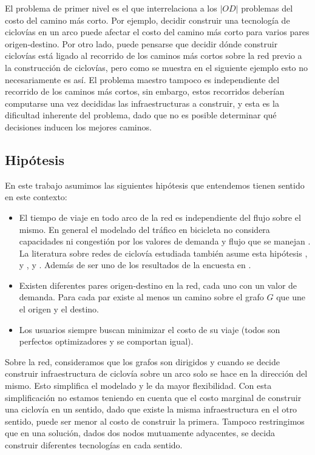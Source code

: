 \documentclass{article}
\begin{document}
  El problema de primer nivel es el que interrelaciona a los $|OD|$ problemas del costo del camino más corto. Por ejemplo, decidir construir una tecnología de ciclovías en un arco puede afectar el costo del camino más corto para varios pares origen-destino. Por otro lado, puede pensarse que decidir dónde construir ciclovías está ligado al recorrido de los caminos más cortos sobre la red previo a la construcción de ciclovías, pero como se muestra en el siguiente ejemplo esto no necesariamente es así. El problema maestro tampoco es independiente del recorrido de los caminos más cortos, sin embargo, estos recorridos deberían computarse una vez decididas las infraestructuras a construir, y esta es la dificultad inherente del problema, dado que no es posible determinar qué decisiones inducen los mejores caminos.

  \subsection{Hipótesis}

  En este trabajo asumimos las siguientes hipótesis que entendemos tienen sentido en este contexto:

  \begin{itemize}
    \item{El tiempo de viaje en todo arco de la red es independiente del flujo sobre el mismo. En general el modelado del tráfico en bicicleta no considera capacidades ni congestión por los valores de demanda y flujo que se manejan \cite{Sheffi1985}. La literatura sobre redes de ciclovía estudiada también asume esta hipótesis \cite{Lin2013}, \cite{Duthie2014} y \cite{liu2019},  \cite{Zhu2019} y \cite{baya2021}. Además de ser uno de los resultados de la encuesta en \cite{broach2012}.}
    \item{Existen diferentes pares origen-destino en la red, cada uno con un valor de demanda. Para cada par existe al menos un camino sobre el grafo $G$ que une el origen y el destino.}
    \item{Los usuarios siempre buscan minimizar el costo de su viaje (todos son perfectos optimizadores y se comportan igual).}
  \end{itemize}

  Sobre la red, consideramos que los grafos son dirigidos y cuando se decide construir infraestructura de ciclovía sobre un arco solo se hace en la dirección del mismo. Esto simplifica el modelado y le da mayor flexibilidad. Con esta simplificación no estamos teniendo en cuenta que el costo marginal de construir una ciclovía en un sentido, dado que existe la misma infraestructura en el otro sentido, puede ser menor al costo de construir la primera. Tampoco restringimos que en una solución, dados dos nodos mutuamente adyacentes, se decida construir diferentes tecnologías en cada sentido.
\end{document}
